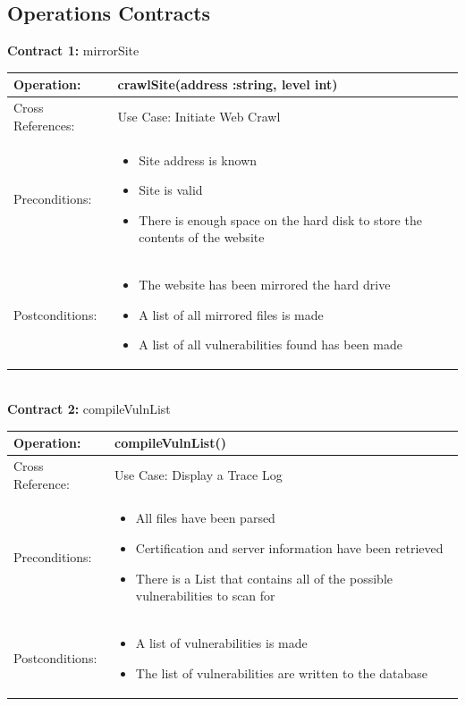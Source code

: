 \documentclass{article}
\begin{document}
\newpage
\subsection{Operations Contracts}
{\large \bf Contract 1:} mirrorSite \\[.5cm]
\begin{tabular}{|p{} | p{}|}
\hline
Operation: & crawlSite(address :string, level int) \\ \hline
Cross References: & Use Case: Initiate Web Crawl\\ \hline
Preconditions: &
\begin{itemize}
	\item Site address is known
	\item Site is valid
	\item There is enough space on the hard disk to store the contents of the website
\end{itemize}\\ \hline

Postconditions: &
\begin{itemize}
	\item The website has been mirrored the hard drive
	\item A list of all mirrored files is made
	\item A list of all vulnerabilities found has been made
\end{itemize}\\ \hline
\end{tabular} \\[1cm]

{\large \bf Contract 2:} compileVulnList\\[.5cm]
\begin{tabular}{|p{} | p{}|}
\hline
Operation: & compileVulnList() \\ \hline
Cross Reference: & Use Case: Display a Trace Log \\ \hline
Preconditions: & 
\begin{itemize}	
	\item All files have been parsed
	\item Certification and server information have been retrieved
	\item There is a List that contains all of the possible vulnerabilities to scan for
\end{itemize} \\ \hline

Postconditions:	&
\begin{itemize}
	\item A list of vulnerabilities is made
	\item The list of vulnerabilities are written to the database
	
\end{itemize} \\ \hline
\end{tabular}
\newpage
\end{document}
